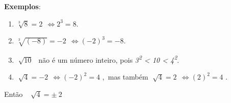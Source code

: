 \textbf{Exemplos}:

\begin{enumerate}
	\item  \( \sqrt[3]{8}=2~~ \Longleftrightarrow   2^{3}=8. \) 

	\item  \( \sqrt[3]{ \left( -8 \right) }=-2~~ \Longleftrightarrow    \left( -2 \right) ^{3}=-8. \) 

	\item  \( \sqrt[]{10}~~ \) não é um número inteiro, pois \textit{3\textsuperscript{2} < 10 < 4\textsuperscript{2}}.

	\item  \( \sqrt[]{4}=-2~~ \Longleftrightarrow    \left( -2 \right) ^{2}=4 \) ,~mas também   \( \sqrt[]{4}=2~~ \Longleftrightarrow    \left( 2 \right) ^{2}=4 \) . 
\end{enumerate}

Então~  \( \sqrt[]{4}= \pm ~2   \) \qedsymbol{}

